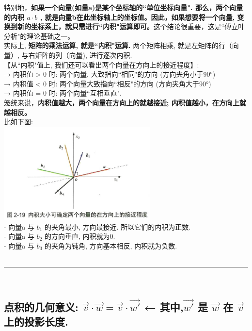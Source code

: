\documentclass[UTF8]{ctexart}
\begin{document}
特别地，\textbf{如果一个向量(如量a)是某个坐标轴的``单位坐标向量". 那么，两个向量的内积 $a \cdot b$ , 就是向量b在此坐标轴上的坐标值。因此，如果想要将一个向量, 变换到新的坐标系上，就只需进行``内积"运算即可。}这个结论很重要，这是``傅立叶分析"的理论基础之一。\\

实际上,\textbf{ 矩阵的乘法运算, 就是``内积"运算.} 两个矩阵相乘, 就是左矩阵的行（向量）, 与右矩阵的列（向量), 进行逐次内积. \\



【从``内积"值上, 我们还可以看出两个向量在方向上的接近程度】:\\
→ 内积值 > 0 时: 两个向量, 大致指向``相同"的方向 (方向夹角小于90°)\\
→ 内积值 < 0 时: 两个向量大致指向``相反"的方向 (方向夹角大于90°)\\
→ 内积值 = 0 时: 两个向量``互相垂直".\\

笼统来说，\textbf{内积值越大，两个向量在方向上的就越接近; 内积值越小，在方向上就越相反。}\\

比如下图: \\
\includegraphics[width=0.6\textwidth]{img/0128.png}\\
- 向量a 与 $b_1$ 的夹角最小, 方向最接近. 所以它们的内积为正数. \\
- 向量a 与 $b_2$ 的方向垂直, 内积就为0. \\
- 向量a 与 $b_3$ 的夹角为钝角, 方向基本相反, 内积就为负数. \\








~\\
\hrule
~\\



\subsection{点积的几何意义: $\vec{v} \cdot \vec{w} = \vec{v} \cdot \vec{w'}$ ← 其中,$\vec{w'}$ 是 $\vec{w}$ 在 $\vec{v}$ 上的投影长度. }
\end{document}
